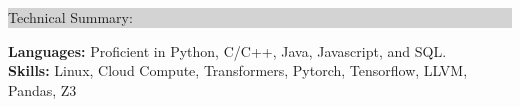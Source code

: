 \documentclass{article} %
\newcommand{\rsection}[1]{
  \hspace{-0.4cm}\vspace{0.1cm}
\colorbox{lightgrey}{
\begin{minipage}{1.07\linewidth}
\vspace{0.22cm}
\fontsize{14pt}{16pt}\selectfont #1
\vspace{0.12cm}
\end{minipage}
}
\vspace*{-0.1cm}
}
\newcommand{\rjob}[2]{
  \hspace*{-0.3cm}
{\fontsize{10pt}{12pt}\selectfont #1} \hfill #2
\vspace*{0.1cm}
\hspace*{-1.2cm}
}
\newenvironment{ritemize}{
\hspace*{-0.8cm}
\begin{minipage}{1.05\linewidth}
\begin{itemize}
}{
\end{itemize}
\end{minipage}
}
\newcommand{\ritem}{
\item[-]
}
\begin{document}





\rsection{Technical Summary:}

\hspace*{-0.3cm}
\textbf{Languages:} Proficient in Python, C/C++, Java, Javascript, and SQL. \\
\hspace*{-0.3cm}
\textbf{Skills:} Linux, Cloud Compute, Transformers, Pytorch, Tensorflow, LLVM, Pandas, Z3
\end{document}
